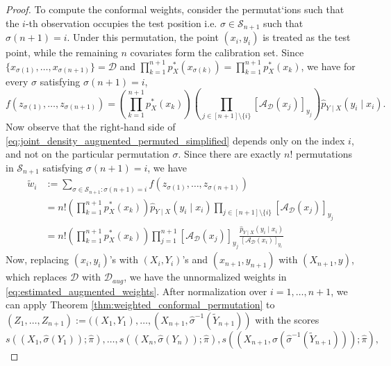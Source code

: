 \documentclass[11pt,letterpaper]{article}
\theoremstyle{definition}
\newcommand{\cD}{\mathcal{D}}
\begin{document}
\begin{proof}
To compute the conformal weights, consider the permutat`ions such that the \(i\)-th observation occupies the test position i.e. \(\sigma \in \mathcal S_{n+1}\) such that $\sigma(n+1)=i$.
Under this permutation, the point \((x_i,y_i)\) is treated as the test point, while the remaining \(n\) covariates form the calibration set. Since \(\{x_{\sigma(1)},\ldots,x_{\sigma(n+1)}\} = \cD\) and $\prod_{k=1}^{n+1} p_X^\ast(x_{\sigma(k)})
=\prod_{k=1}^{n+1} p_X^\ast(x_k)$, we have for every \(\sigma\) satisfying \(\sigma(n+1)=i\),
\begin{equation}
    \label{eq:joint_density_augmented_permuted_simplified}
    f(z_{\sigma(1)},\ldots,z_{\sigma(n+1)})
    =
    \left(\prod_{k=1}^{n+1} p_X^\ast(x_k)\right)
    \left(\prod_{j \in [n + 1] \setminus \{i\}} [\mathcal A_{\cD}(x_j)]_{y_j}\right)
    \hat{p}_{Y\mid X}(y_i\mid x_i).
\end{equation}
Now observe that the right-hand side of \eqref{eq:joint_density_augmented_permuted_simplified} depends only on the index \(i\), and not on the particular permutation \(\sigma\). Since there are exactly \(n!\) permutations in \(\mathcal S_{n+1}\) satisfying \(\sigma(n+1)=i\), we have
\begin{equation*}
    \begin{split}
        \tilde w_i 
        & := \sum_{\sigma \in \mathcal{S}_{n+1}:\sigma(n+1)=i} f(z_{\sigma(1)},\ldots,z_{\sigma(n+1)}) \\
        & =
        n!\left(\prod_{k=1}^{n+1} p_X^\ast(x_k)\right)
        \hat{p}_{Y\mid X}(y_i \mid x_i)
        \prod_{j \in [n + 1] \setminus \{i\}} \left[\mathcal A_{\cD}(x_j)\right]_{y_j} \\
        & = n!\left(\prod_{k=1}^{n+1} p_X^\ast(x_k)\right) \prod_{j= 1}^{n + 1} \left[\mathcal A_{\cD}(x_j)\right]_{y_j} \frac{\hat{p}_{Y\mid X}(y_i \mid x_i)}{ \left[\mathcal A_{\cD}(x_i)\right]_{y_i}}
    \end{split}
\end{equation*}
Now, replacing $(x_i, y_i)$'s with $(X_i, Y_i)$'s and $(x_{n + 1}, y_{n + 1})$ with $(X_{n + 1}, y)$, which replaces $\cD$ with $\cD_{aug}$, we have the unnormalized weights in \eqref{eq:estimated_augmented_weights}. After normalization over \(i=1,\ldots,n+1\), we can apply Theorem \ref{thm:weighted_conformal_permutation} to $(Z_1,\ldots,Z_{n+1}) := ((X_1, Y_1), \ldots, (X_{n + 1}, \hat{\sigma}^{-1}(\tilde{Y}_{n + 1}))$ with the scores 
\begin{equation*}
    s((X_1, \hat{\sigma}(Y_1)); \hat{\pi}), \ldots, s((X_n, \hat{\sigma}(Y_n)); \hat{\pi}), s((X_{n + 1}, \hat{\sigma}(\hat{\sigma}^{-1}(\tilde{Y}_{n + 1}))); \hat{\pi}),

\end{equation*}
\end{proof}
\end{document}
